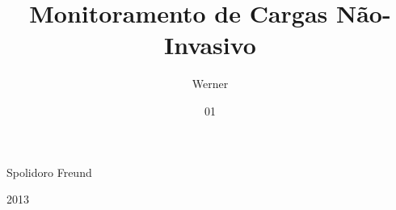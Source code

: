 \documentclass[msc,numbers]{coppe}
\begin{document}
  
  
  

  \title{Monitoramento de Cargas Não-Invasivo}
  \foreigntitle{}
  \author{Werner}{Spolidoro Freund}

  \date{01}{2013}


  \maketitle

  \frontmatter
  \vfill
  \cleardoublepage {} {}
  \tableofcontents \vfill
  \cleardoublepage {}
  \listoffigures \vfill
  \cleardoublepage {}
  \listoftables \vfill
  \cleardoublepage {} {}
  \printglossary[type=Simb] \vfill
  \cleardoublepage {} {}
  \renewcommand{\glossarypreamble}{No caso de algumas abreviaturas internacionalmente conhecidas, optou-se por mantê-las em sua lingua original.}
  \printglossary[type=Abrev] \vfill


  \mainmatter
  
  

  \glsaddall

  \backmatter
  
  

  \appendix
\end{document}
